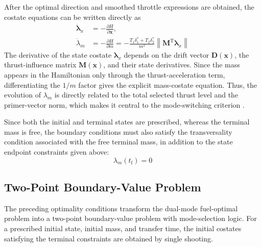 \documentclass{IEEEtaes}
\begin{document}
After the optimal direction and smoothed throttle expressions are obtained, the costate equations can be written directly as
\begin{equation}
\begin{aligned}
\dot{\bm{\lambda}}_x&=-\frac{\partial H}{\partial \bm{x}},\\
\dot{\lambda}_m&=-\frac{\partial H}{\partial m}
=-\frac{T_1\delta_1^{*}+T_2\delta_2^{*}}{m^2}\left\|\bm{M}^{\mathrm{T}}\bm{\lambda}_x\right\|
\end{aligned}
\end{equation}
The derivative of the state costate $\bm{\lambda}_x$ depends on the drift vector $\bm{D}(\bm{x})$, the thrust-influence matrix $\bm{M}(\bm{x})$, and their state derivatives. Since the mass appears in the Hamiltonian only through the thrust-acceleration term, differentiating the $1/m$ factor gives the explicit mass-costate equation. Thus, the evolution of $\lambda_m$ is directly related to the total selected thrust level and the primer-vector norm, which makes it central to the mode-switching criterion \cite{chi2022,russell2007,cline2024a}.

Since both the initial and terminal states are prescribed, whereas the terminal mass is free, the boundary conditions must also satisfy the transversality condition associated with the free terminal mass, in addition to the state endpoint constraints given above:
\begin{equation}
\lambda_m(t_{\mathrm{f}})=0
\end{equation}

\subsection{Two-Point Boundary-Value Problem}
The preceding optimality conditions transform the dual-mode fuel-optimal problem into a two-point boundary-value problem with mode-selection logic. For a prescribed initial state, initial mass, and transfer time, the initial costates satisfying the terminal constraints are obtained by single shooting.
\end{document}
